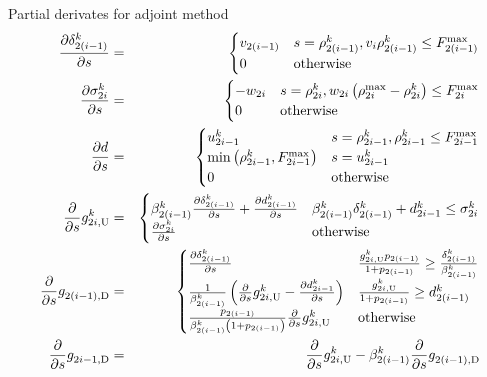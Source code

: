 \begin{frame}{Partial derivates for adjoint method}
\fontsize{6pt}{7.2}\selectfont
\begin{eqnarray*}
\frac{\partial\delta_{2\left(i-1\right)}^{k}}{\partial s} & = & \begin{cases}
v_{2\left(i-1\right)} & s=\rho_{2\left(i-1\right)}^{k},v_{i}\rho_{2\left(i-1\right)}^{k}\le F_{2\left(i-1\right)}^{\max}\\
0 & \text{otherwise}
\end{cases}\\
\frac{\partial\sigma_{2i}^{k}}{\partial s} & = & \begin{cases}
-w_{2i} & s=\rho_{2i}^{k},w_{2i}\left(\rho_{2i}^{\max}-\rho_{2i}^{k}\right)\le F_{2i}^{\max}\\
0 & \text{otherwise}
\end{cases}\\
\frac{\partial d}{\partial s} & = & \begin{cases}
u_{2i-1}^{k} & s=\rho_{2i-1}^{k},\rho_{2i-1}^{k}\le F_{2i-1}^{\max}\\
\min\left(\rho_{2i-1}^{k},F_{2i-1}^{\max}\right) & s=u_{2i-1}^{k}\\
0 & \text{otherwise}
\end{cases}\\
\frac{\partial}{\partial s}g_{2i,\text{U}}^{k} & = & \begin{cases}
\beta_{2\left(i-1\right)}^{k}\frac{\partial\delta_{2\left(i-1\right)}^{k}}{\partial s}+\frac{\partial d_{2\left(i-1\right)}^{k}}{\partial s} & \beta_{2\left(i-1\right)}^{k}\delta_{2\left(i-1\right)}^{k}+d_{2i-1}^{k}\le\sigma_{2i}^{k}\\
\frac{\partial\sigma_{2i}^{k}}{\partial s} & \text{otherwise}
\end{cases}\\
\frac{\partial}{\partial s}g_{2\left(i-1\right),\text{D}}^{} & = & \begin{cases}
\frac{\partial\delta_{2\left(i-1\right)}^{k}}{\partial s} & \frac{g_{2i,\text{U}}^{k}p_{2(i-1)}}{1+p_{2(i-1)}}\ge\frac{\delta_{2\left(i-1\right)}^{k}}{\beta_{2\left(i-1\right)}^{k}}\\
\frac{1}{\beta_{2\left(i-1\right)}^{k}}\left(\frac{\partial}{\partial s}g_{2i,\text{U}}^{k}-\frac{\partial d_{2i-1}^{k}}{\partial s}\right) & \frac{g_{2i,\text{U}}^{k}}{1+p_{2(i-1)}}\ge d_{2\left(i-1\right)}^{k}\\
\frac{p_{2(i-1)}}{\beta_{2\left(i-1\right)}^{k}\left(1+p_{2(i-1)}\right)}\frac{\partial}{\partial s}g_{2i,\text{U}}^{k} & \text{otherwise}
\end{cases}\\
\frac{\partial}{\partial s}g_{2i-1,\text{D}}^{} & = & \frac{\partial}{\partial s}g_{2i,\text{U}}^{k}-\beta_{2\left(i-1\right)}^{k}\frac{\partial}{\partial s}g_{2\left(i-1\right),\text{D}}^{}
\end{eqnarray*}
\end{frame}

